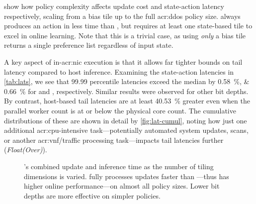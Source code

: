  show how policy complexity affects update cost and state-action latency respectively, scaling from a bias tile up to the full \gls{acr:ddos} policy size.
\Coopfw{} always produces an action in less time than \Indfw{}, but requires at least one state-based tile to excel in online learning.
Note that this is a trivial case, as using \emph{only} a bias tile returns a single preference list regardless of input state.

A key aspect of in-\gls{acr:nic} execution is that it allows far tighter bounds on tail latency compared to host inference.
Examining the state-action latencies in \cref{tab:lats}, we see that \num{99.99} percentile latencies exceed the median by \qtylist{0.58;0.66}{\percent} for \Indfw{} and \Coopfw{}, respectively.
Similar results were observed for other bit depths.
By contrast, host-based tail latencies are at least \qty{40.53}{\percent} greater even when the parallel worker count is at or below the physical core count.
The cumulative distributions of these are shown in detail by \cref{fig:lat-cumul}, noting how just one additional \gls{acr:cpu}-intensive task---potentially automated system updates, scans, or another \gls{acr:vnf}/traffic processing task---impacts tail latencies further (\emph{Float(Over)}).

\begin{figure}
	\caption[\approachshort{}'s combined update and inference time as the number of tiling dimensions is varied.]{\approachshort{}'s combined update and inference time as the number of tiling dimensions is varied. \Coopfw{} fully processes updates faster than \Indfw{}---thus has higher online performance---on almost all policy sizes. Lower bit depths are more effective on simpler policies.\label{fig:vary-work}}
\end{figure}


